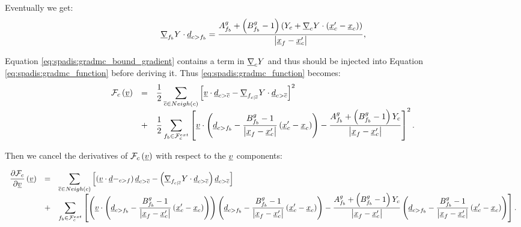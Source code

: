 Eventually we get:
\begin{equation}\label{eq:spadis:gradmc_bound_gradient}
\underline{\nabla}_{{{f}_{b}}} Y   \cdot \underline{d}_{c>{{f}_{b}}} =
\dfrac{
A^g_{{{f}_{b}}} +\left(B^g_{{{f}_{b}}} -1 \right) \left( Y_{c} +  \underline{\nabla}_{c} Y \cdot \left(\underline{x}_{c}^\prime - {\underline{x}_{c}}\right) \right)
}{
\left| \underline{x}_{{f}} - \underline{x}_{c}^\prime \right|
},
\end{equation}

Equation \eqref{eq:spadis:gradmc_bound_gradient} contains a term in $\underline{\nabla}_{c} Y$
and thus should be injected into Equation
\eqref{eq:spadis:gradmc_function} before deriving it. Thus \eqref{eq:spadis:gradmc_function} becomes:
\begin{equation}\label{eq:spadis:gradmc_function2}
\begin{array}{r c l}
\mathcal{F}_{c}
\left( \underline{v} \right)& =&
\displaystyle
\dfrac{1}{2}\sum\limits_{ {\overline{c}} \in Neigh\left(c\right) }\left[
\underline{v}   \cdot \underline{d}_{{c > {\overline{c}}}}  -  \underline{\nabla}_{{{f}_{c|{\overline{c}}}}} Y   \cdot \underline{d}_{{c > {\overline{c}}}}
\right]^2 \\
&+&
\displaystyle
\dfrac{1}{2}\sum\limits_{ {{f}_{b}} \in \mathcal{F}^{ext}_{c}}\left[
  \underline{v}   \cdot
  \left( \underline{d}_{c>{{f}_{b}}} -  \dfrac{B^g_{{{f}_{b}}} -1 }{\left| \underline{x}_{{f}} - \underline{x}_{c}^\prime \right|} \left(\underline{x}_{c}^\prime - {\underline{x}_{c}}\right) \right)
-
\dfrac{
A^g_{{{f}_{b}}} +\left(B^g_{{{f}_{b}}} -1 \right) Y_{c}
}{
\left| \underline{x}_{{f}} - \underline{x}_{c}^\prime \right|
}
\right]^2.
\end{array}
\end{equation}


Then we cancel the derivatives of
$\mathcal{F}_c \left( \underline{v} \right)$ with respect to the $ \underline{v}$ components:

\begin{equation}\label{eq:spadis:gradmc_function_derivative}
\begin{array}{r c l}
\dfrac{\partial \mathcal{F}_{c}}{\partial \underline{v} }
\left( \underline{v} \right)& =&
\displaystyle
\sum\limits_{ {\overline{c}} \in Neigh\left(c\right) }\left[
\left(\underline{v}   \cdot \underline{d}-_{{c>f}} \right) \underline{d}_{{c > {\overline{c}}}}
-  \left(\underline{\nabla}_{{{f}_{c|{\overline{c}}}}} Y   \cdot \underline{d}_{{c > {\overline{c}}}} \right)  \underline{d}_{{c > {\overline{c}}}}
\right] \\
&+&
\displaystyle
\sum\limits_{ {{f}_{b}} \in \mathcal{F}^{ext}_{c}}\left[
  \left( \underline{v}   \cdot
  \left( \underline{d}_{c>{{f}_{b}}} -  \dfrac{B^g_{{f}_{b}} -1 }{\left| \underline{x}_{{f}} - \underline{x}_{c}^\prime \right|} \left(\underline{x}_{c}^\prime - {\underline{x}_{c}}\right) \right) \right)
  \left( \underline{d}_{c>{{f}_{b}}} -  \dfrac{B^g_{{f}_{b}} -1 }{\left| \underline{x}_{{f}} - \underline{x}_{c}^\prime \right|} \left(\underline{x}_{c}^\prime - {\underline{x}_{c}}\right) \right)
-
\dfrac{
A^g_{{{f}_{b}}} +\left(B^g_{{{f}_{b}}} -1 \right) Y_c
}{
\left| \underline{x}_{{f}} - \underline{x}_{c}^\prime \right|
}
\left( \underline{d}_{c>{{f}_{b}}} -  \dfrac{B^g_{{{f}_{b}}} -1 }{\left| \underline{x}_{{f}} - \underline{x}_{c}^\prime \right|} \left(\underline{x}_{c}^\prime - {\underline{x}_{c}}\right) \right)
\right].
\end{array}
\end{equation}



